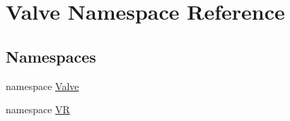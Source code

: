 \hypertarget{namespace_valve}{}\section{Valve Namespace Reference}
\label{namespace_valve}
\subsection*{Namespaces}
\begin{DoxyCompactItemize}
\item 
namespace \mbox{\hyperlink{namespace_valve_1_1_valve}{Valve}}
\item 
namespace \mbox{\hyperlink{namespace_valve_1_1_v_r}{VR}}
\end{DoxyCompactItemize}
